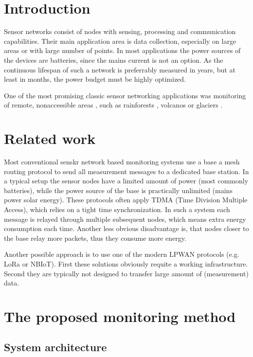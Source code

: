 \documentclass[conference]{IEEEtran}
\begin{document}
\section{Introduction}

Sensor networks consist of nodes with sensing, processing and communication
capabilities. Their main application area is data collection, especially
on large areas or with large number of points. In most applications
the power sources of the devices are batteries, since the mains current
is not an option. As the continuous lifespan of such a network is
preferrably measured in years, but at least in months, the power
budget must be highly optimized.

One of the most promising classic sensor networking applications was monitoring
of remote, nonaccessible areas \cite{corke2010}, such as rainforests
\cite{wark2008, cama2013}, volcanos \cite{werner2006, song2009} or glaciers
\cite{martinez2004, martinez2005}. 

\section{Related work}

Most conventional senskr network based monitoring
systems use a base a mesh routing protocol to
send all measurement messages to a dedicated base
station. In a typical setup the sensor nodes have
a limited amount of power (most commonly batteries),
while the power source of the base is practically
unlimited (mains power solar energy). These protocols
often apply TDMA (Time Division Multiple Access),
which relies on a tight time synchronization.
In such a system each message is relayed through
multiple subsequent nodes, which means extra energy
consumption each time. Another less obvious
disadvantage is, that nodes closer to the base
relay more packets, thus they consume more energy.

Another possible approach is to use one of the
modern LPWAN protocols (e.g. LoRa or NBIoT).
First these solutions obviously requite a working
infrastructure. Second they are typically not
designed to transfer large amount of (measurement)
data.

\section{The proposed monitoring method}

\subsection{System architecture}
\end{document}
